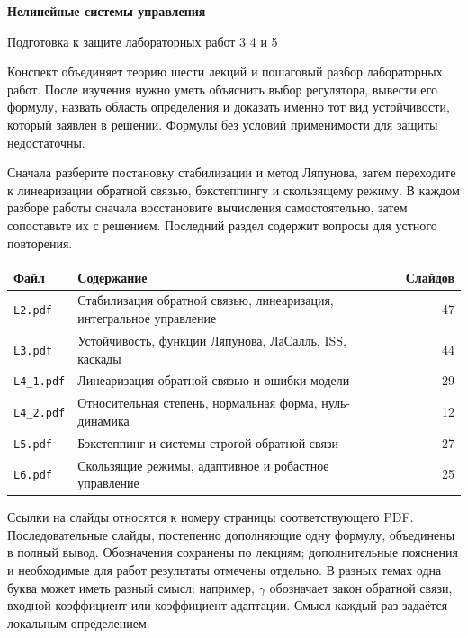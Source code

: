 \documentclass[12pt,a4paper]{article}
\numberwithin{equation}{section}
\begin{document}
\begin{center}
  {\LARGE\bfseries Нелинейные системы управления\par}
  \vspace{5mm}
  {\large Подготовка к защите лабораторных работ 3 4 и 5\par}
\end{center}

Конспект объединяет теорию шести лекций и пошаговый разбор лабораторных
работ. После изучения нужно уметь объяснить выбор регулятора, вывести его
формулу, назвать область определения и доказать именно тот вид устойчивости,
который заявлен в решении. Формулы без условий применимости для защиты
недостаточны.

Сначала разберите постановку стабилизации и метод Ляпунова, затем переходите
к линеаризации обратной связью, бэкстеппингу и скользящему режиму. В каждом
разборе работы сначала восстановите вычисления самостоятельно, затем
сопоставьте их с решением. Последний раздел содержит вопросы для устного
повторения.

\begin{center}
\begin{tabularx}{\textwidth}{@{}lYr@{}}
\toprule
Файл & Содержание & Слайдов\\
\midrule
\texttt{L2.pdf} & Стабилизация обратной связью, линеаризация, интегральное управление & 47\\
\texttt{L3.pdf} & Устойчивость, функции Ляпунова, ЛаСалль, ISS, каскады & 44\\
\texttt{L4\_1.pdf} & Линеаризация обратной связью и ошибки модели & 29\\
\texttt{L4\_2.pdf} & Относительная степень, нормальная форма, нуль-динамика & 12\\
\texttt{L5.pdf} & Бэкстеппинг и системы строгой обратной связи & 27\\
\texttt{L6.pdf} & Скользящие режимы, адаптивное и робастное управление & 25\\
\bottomrule
\end{tabularx}
\end{center}

Ссылки на слайды относятся к номеру страницы соответствующего PDF.
Последовательные слайды, постепенно дополняющие одну формулу, объединены
в полный вывод. Обозначения сохранены по лекциям; дополнительные пояснения
и необходимые для работ результаты отмечены отдельно. В разных темах одна
буква может иметь разный смысл: например, $\gamma$ обозначает закон обратной
связи, входной коэффициент или коэффициент адаптации. Смысл каждый раз
задаётся локальным определением.

\tableofcontents
\clearpage

\clearpage

\clearpage

\clearpage

\clearpage

\clearpage

\clearpage

\end{document}
